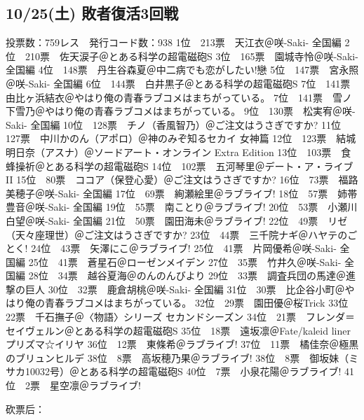 \subsection{10/25(土) 敗者復活3回戦}

	投票数：759レス　発行コード数：938
	1位　213票　天江衣＠咲-Saki- 全国編
	2位　210票　佐天涙子＠とある科学の超電磁砲S
	3位　165票　園城寺怜＠咲-Saki- 全国編
	4位　148票　丹生谷森夏＠中二病でも恋がしたい!戀
	5位　147票　宮永照＠咲-Saki- 全国編
	6位　144票　白井黒子＠とある科学の超電磁砲S
	7位　141票　由比ヶ浜結衣＠やはり俺の青春ラブコメはまちがっている。
	7位　141票　雪ノ下雪乃＠やはり俺の青春ラブコメはまちがっている。
	9位　130票　松実宥＠咲-Saki- 全国編
	10位　128票　チノ（香風智乃）＠ご注文はうさぎですか?
	11位　127票　中川かのん（アポロ）＠神のみぞ知るセカイ 女神篇
	12位　123票　結城明日奈（アスナ）＠ソードアート・オンライン Extra Edition
	13位　103票　食蜂操祈＠とある科学の超電磁砲S
	14位　102票　五河琴里＠デート・ア・ライブII
	15位　80票　ココア（保登心愛）＠ご注文はうさぎですか?
	16位　73票　福路美穂子＠咲-Saki- 全国編
	17位　69票　絢瀬絵里＠ラブライブ!
	18位　57票　姉帯豊音＠咲-Saki- 全国編
	19位　55票　南ことり＠ラブライブ!
	20位　53票　小瀬川白望＠咲-Saki- 全国編
	21位　50票　園田海未＠ラブライブ!
	22位　49票　リゼ（天々座理世）＠ご注文はうさぎですか?
	23位　44票　三千院ナギ＠ハヤテのごとく!
	24位　43票　矢澤にこ＠ラブライブ!
	25位　41票　片岡優希＠咲-Saki- 全国編
	25位　41票　蒼星石＠ローゼンメイデン
	27位　35票　竹井久＠咲-Saki- 全国編
	28位　34票　越谷夏海＠のんのんびより
	29位　33票　調査兵団の馬達＠進撃の巨人
	30位　32票　鹿倉胡桃＠咲-Saki- 全国編
	31位　30票　比企谷小町＠やはり俺の青春ラブコメはまちがっている。
	32位　29票　園田優＠桜Trick
	33位　22票　千石撫子＠〈物語〉シリーズ セカンドシーズン
	34位　21票　フレンダ＝セイヴェルン＠とある科学の超電磁砲S
	35位　18票　遠坂凛＠Fate/kaleid liner プリズマ☆イリヤ
	36位　12票　東條希＠ラブライブ!
	37位　11票　橘佳奈＠極黒のブリュンヒルデ
	38位　8票　高坂穂乃果＠ラブライブ!
	38位　8票　御坂妹（ミサカ10032号）＠とある科学の超電磁砲S
	40位　7票　小泉花陽＠ラブライブ!
	41位　2票　星空凛＠ラブライブ!

砍票后：

